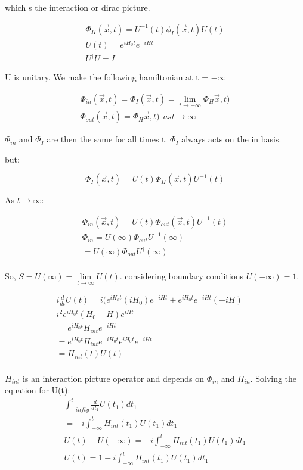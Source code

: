 \documentclass[]{article}
\begin{document}
	which s the interaction or dirac picture.
	
	\begin{align}
	\Phi_H(\vec{x}, t) = U^{-1}(t)\phi_I(\vec{x}, t)U(t) \\
	U(t) = e^{iH_0t}e^{-iHt} \\
	U^\dagger U = I
	\end{align}
	
	U is unitary. We make the following hamiltonian at t = $-\infty$
	
	\begin{align}
	\Phi_{in}(\vec{x}, t) = \Phi_I(\vec{x}, t) = \lim\limits_{t\rightarrow-\infty}\Phi_H\vec{x}, t) \\
	\Phi_{out}(\vec{x}, t) = \Phi_H\vec{x}, t) \:\:as t\rightarrow\infty
	\end{align}
	
	$\Phi_{in} $ and $\Phi_{I}$ are then the same for all times t. $\Phi_I$ always acts on the in basis.
	
	but:
	
	\begin{equation}
	{\Phi_I(\vec{x}, t) = U(t)\Phi_H(\vec{x}, t)U^{-1}(t)}
	\end{equation}
	
	As $t\rightarrow\infty$:
	
	\begin{align}
		\Phi_{in}(\vec{x}, t) = U(t)\Phi_{out}(\vec{x}, t)U^{-1}(t) \\
			\Phi_{in} = U(\infty)\Phi_{out}U^{-1}(\infty) \\
			= U(\infty)\Phi_{out}U^\dagger(\infty) \\
	\end{align}
	
	So, $S = U(\infty) = \lim\limits_{t\rightarrow\infty}U(t)$. considering boundary conditions $U(-\infty) = 1$.
	
	\begin{align}
		i\frac{d}{dt}U(t) = i(e^{iH_0t}(iH_0)e^{-iHt} + e^{iH_0t}e^{-iHt}(-iH) = \\ i^2e^{iH_0t}(H_0 - H)e^{iHt} \\
		=e^{iH_0t}H_{int}e^{-iHt} \\
		= e^{iH_0t}H_{int}e^{-iH_0t}e^{iH_0t}e^{-iHt} \\
		= H_{int}(t)U(t) \\
	\end{align}
	
	$H_{int}$ is an interaction picture operator and depends on $\Phi_{in}$ and $\Pi_{in}$. Solving the equation for U(t):
	\begin{align}
		\int_{-infty}^{t}\frac{d}{dt_1}U(t_1)dt_1 \\ =-i\int_{-\infty}^{t}H_{int}(t_1)U(t_1)dt_1 \\
		U(t) - U(-\infty) = -i\int_{-\infty}^{t}H_{int}(t_1)U(t_1)dt_1 \\
		U(t) = 1 -i\int_{-\infty}^{t}H_{int}(t_1)U(t_1)dt_1  \\
	\end{align}
	
\end{document}
